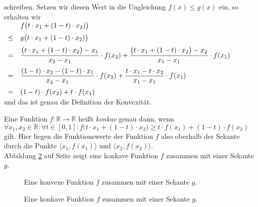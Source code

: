 \begin{Definition}
schreiben.  Setzen wir diesen Wert in die Ungleichung $f(x) \leq g(x)$ ein, so erhalten wir
\\[0.2cm]
\hspace*{1.3cm}
$
\begin{array}[t]{cl}
      &  f\bigl(t \cdot x_1 + (1-t) \cdot x_2)\bigr) \\[0.2cm]
 \leq & g\bigl(t \cdot x_1 + (1-t) \cdot x_2)\bigr)  \\[0.2cm]
  =   & \displaystyle \frac{\bigl(t \cdot x_1 + (1-t) \cdot x_2\bigr) - x_1}{x_2-x_1} \cdot f(x_2) + 
            \frac{\bigl(t \cdot x_1 + (1-t) \cdot x_2\bigr) - x_2}{x_1-x_1} \cdot f(x_1) 
        \\[0.4cm]
  =   & \displaystyle \frac{(1-t) \cdot x_2 - (1-t) \cdot x_1}{x_2-x_1} \cdot f(x_2) + 
            \frac{t \cdot x_1 - t \cdot x_2}{x_1-x_1} \cdot f(x_1) 
        \\[0.4cm]
  =   & \displaystyle (1-t) \cdot f(x_2) + t \cdot f(x_1) 
\end{array}
$
\\[0.2cm]
und das ist genau die Definition der Konvexit\"at.
\vspace*{0.2cm}

Eine Funktion $f:\mathbb{R} \rightarrow \mathbb{R}$ hei{\ss}t \emph{konkav} genau dann, wenn 
\\[0.2cm]
\hspace*{1.3cm}
$\forall x_1,x_2 \in \mathbb{R}:\forall t\in [0,1]: 
  f\bigl(t \cdot x_1 + (1-t)\cdot x_2\bigr) \geq t \cdot f(x_1) + (1 - t) \cdot f(x_2)
$
\\[0.2cm]
gilt.  Hier liegen die Funktionswerte der Funktion $f$ also oberhalb 
der Sekante durch die Punkte 
$\bigl\langle x_1, f(x_1) \bigl\rangle$ und $\bigl\langle x_2, f(x_2) \bigl\rangle$.
\\[0.2cm]
Abbildung \ref{fig:concav.eps} auf Seite \pageref{fig:concav.eps} zeigt eine konkave Funktion $f$
zusammen mit einer Sekante $g$.  
\eod
\end{Definition}

\begin{figure}[!h]
  \centering
   \caption{Eine konvexe Funktion $f$ zusammen mit einer Sekante $g$.}
  \label{fig:convex.eps}
\end{figure}
\begin{figure}[!h]
  \centering
   \caption{Eine konkave Funktion $f$ zusammen mit einer Sekante $g$.}
  \label{fig:concav.eps}
\end{figure}




